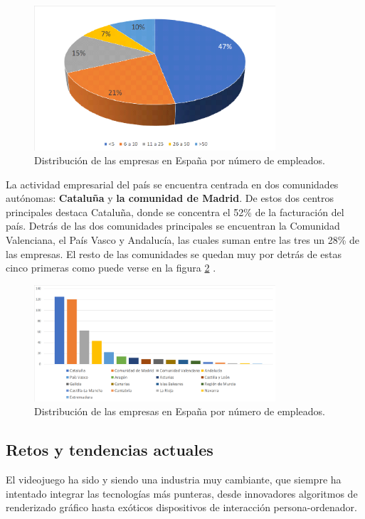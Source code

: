 \begin{figure}[h]
    \centering
    \includegraphics[width=0.8\textwidth]{images/estadodelarte/mercado/distribucion-tamano-esp}
    \caption{Distribución de las empresas en España por número de empleados.}
    \label{distribucion-tamano-esp}
\end{figure}

La actividad empresarial del país se encuentra centrada en dos comunidades autónomas: \textbf{Cataluña} y \textbf{la comunidad de Madrid}. De estos dos centros principales destaca Cataluña, donde se concentra el 52\% de la facturación del país. Detrás de las dos comunidades principales se encuentran la Comunidad Valenciana, el País Vasco y Andalucía, las cuales suman entre las tres un 28\% de las empresas. El resto de las comunidades se quedan muy por detrás de estas cinco primeras como puede verse en la figura \ref{distribucion-comunidades-esp} \cite{libro_blanco}.

\begin{figure}[h]
    \centering
    \includegraphics[width=0.8\textwidth]{images/estadodelarte/mercado/distribucion-comunidades-esp}
    \caption{Distribución de las empresas en España por número de empleados.}
    \label{distribucion-comunidades-esp}
\end{figure}

\subsection{Retos y tendencias actuales}
El videojuego ha sido y siendo una industria muy cambiante, que siempre ha intentado integrar las tecnologías más punteras, desde innovadores algoritmos de renderizado gráfico hasta exóticos dispositivos de interacción persona-ordenador.

